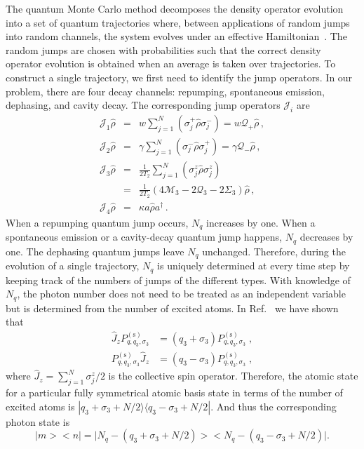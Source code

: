 \documentclass[aps,
twocolumn,
showpacs,
superscriptaddress,groupedaddress]{revtex4}
\begin{document}
The quantum Monte Carlo method decomposes the density operator evolution
into a set of quantum trajectories where, between applications of random
jumps into random channels, the system evolves under an effective
Hamiltonian~\cite{Dalibard92,Dum92,Knight98}.  The random jumps are
chosen with probabilities such that the correct density operator
evolution is obtained when an average is taken over trajectories.  To
construct a single trajectory, we first need to identify the jump
operators. In our problem, there are four decay channels: repumping,
spontaneous emission, dephasing, and cavity decay. The corresponding
jump operators $\mathcal{J}_i$ are
\begin{eqnarray}
\mathcal{J}_1\hat{\rho}&=&
w\sum_{j=1}^N(\sigma_j^+\hat{\rho}\sigma_j^-)=w\mathcal{Q}_{+}\hat{\rho}\,,
\nonumber\\
\mathcal{J}_2\hat{\rho}&=&
\gamma\sum_{j=1}^N(\sigma_j^-\hat{\rho}\sigma_j^+)=
\gamma \mathcal{Q}_{-}\hat{\rho}\,,\nonumber\\
\mathcal{J}_3\hat{\rho}&=&
\frac{1}{2T_2}\sum_{j=1}^N(\sigma_j^{z}\hat{\rho}\sigma_j^{z})
\nonumber\\
&=&\frac{1}{2T_2}(4\mathcal{M}_3-2  \mathcal{Q}_3-2\Sigma_3)\hat{\rho}\,,
\nonumber\\
\mathcal{J}_4\hat{\rho}&=&\kappa a\hat{\rho} a^{\dagger}\,.
\label{jumpo}
\end{eqnarray}
When a repumping quantum jump occurs, $N_q$ increases by one.  When a
spontaneous emission or a cavity-decay quantum jump happens, $N_q$
decreases by one.  The dephasing quantum jumps leave $N_q$ unchanged.
Therefore, during the evolution of a single trajectory, $N_q$ is
uniquely determined at every time step by keeping track of the numbers
of jumps of the different types. With knowledge of $N_q$, the photon
number does not need to be treated as an independent variable but is
determined from the number of excited atoms.  In
Ref.~\cite{PhysRevA.87.062101} we have shown that
\begin{equation}
\begin{split}
  \hat{J}_z P_{q,q_3,\sigma_3}^{(\mathrm{s})}&=
  (q_3+\sigma_3)P_{q,q_3,\sigma_3}^{(\mathrm{s})}\;,\\
  P_{q,q_3,\sigma_3}^{(\mathrm{s})}\hat{J}_z&=
  (q_3-\sigma_3)P_{q,q_3,\sigma_3}^{(\mathrm{s})}\;,
\end{split}
\end{equation}
where $\hat{J}_z=\sum_{j=1}^N\sigma_j^{z}/2$ is the collective spin
operator.  Therefore, the atomic state for a particular fully
symmetrical atomic basis state in terms of the number of excited atoms
is $|q_3+\sigma_3+N/2\rangle\langle q_3-\sigma_3+N/2|$.  And thus the
corresponding photon state is
\begin{equation}
\bigl|m\bigr>\bigl<n\bigr|=
\bigl|N_q-(q_3+\sigma_3+N/2)\bigr>
\bigl<N_q-(q_3-\sigma_3+N/2)\bigr|.
\end{equation}
\end{document}

